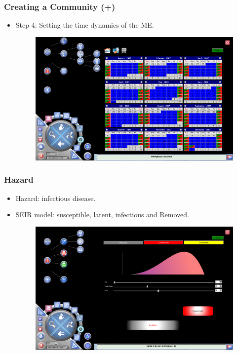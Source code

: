 \documentclass[hyperref={pdfpagelabels=true}]{beamer}
\begin{document}
\begin{frame}
\frametitle{Creating a Community (+)}
\begin{itemize}
\item Step 4: Setting the time dynamics of the ME.
\begin{figure}
\includegraphics[scale=0.4]{community_dynamics.png}
\end{figure}
\end{itemize}
\end{frame}

\begin{frame}
\frametitle{Hazard}
\begin{itemize}
\item Hazard: infectious disease.
\item SEIR model: susceptible, latent, infectious and Removed. %
\begin{figure}
\includegraphics[scale=0.4]{hazard_dynamics.png}
\end{figure}
\end{itemize}
\end{frame}
\end{document}
